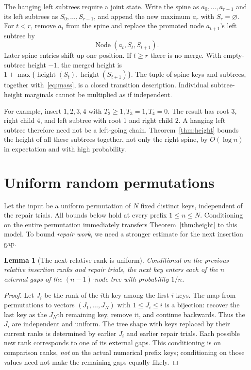 \documentclass[11pt]{article}
\newtheorem{lemma}[theorem]{Lemma}
\begin{document}
The hanging left subtrees require a joint state. Write the spine as
$a_0,\ldots,a_{r-1}$ and its left subtrees as $S_0,\ldots,S_{r-1}$, and append
the new maximum $a_r$ with $S_r=\varnothing$. For $t<r$, remove $a_t$ from
the spine and replace the promoted node $a_{t+1}$'s left subtree by
\begin{equation}
 \operatorname{Node}(a_t,S_t,S_{t+1}).                         \label{eq:merge}
\end{equation}
Later spine entries shift up one position. If $t\ge r$ there is no merge.
With empty-subtree height $-1$, the merged height is
$1+\max\{\operatorname{height}(S_t),\operatorname{height}(S_{t+1})\}$.
The tuple of spine keys and subtrees, together with~\eqref{eq:mass}, is a closed
transition description. Individual subtree-height marginals cannot be multiplied
as if independent.

For example, insert $1,2,3,4$ with $T_2\ge1,T_3=1,T_4=0$. The result has
root $3$, right child $4$, and left subtree with root $1$ and right child $2$.
A hanging left subtree therefore need not be a left-going chain.
Theorem~\ref{thm:height} bounds the height of all these subtrees together,
not only the right spine, by $O(\log n)$ in expectation and with high probability.

\section{Uniform random permutations}\label{sec:random}
Let the input be a uniform permutation of $N$ fixed distinct keys, independent
of the repair trials. All bounds below hold at every prefix $1\le n\le N$.
Conditioning on the entire permutation immediately transfers
Theorem~\ref{thm:height} to this model. To bound \emph{repair work}, we need a
stronger estimate for the next insertion gap.

\begin{lemma}[The next relative rank is uniform]\label{lem:rank}
Conditional on the previous relative insertion ranks and repair trials, the
next key enters each of the $n$ external gaps of the $(n-1)$-node tree with
probability $1/n$.
\end{lemma}
\begin{proof}
Let $J_i$ be the rank of the $i$th key among the first $i$ keys. The map from
permutations to vectors $(J_1,\ldots,J_N)$ with $1\le J_i\le i$ is a bijection:
recover the last key as the $J_N$th remaining key, remove it, and continue
backwards. Thus the $J_i$ are independent and uniform. The tree shape with keys
replaced by their current ranks is determined by earlier $J_i$ and earlier
repair trials. Each possible new rank corresponds to one of its external gaps.
This conditioning is on comparison ranks, \emph{not} on the actual numerical
prefix keys; conditioning on those values need not make the remaining gaps
equally likely.
\end{proof}
\end{document}
